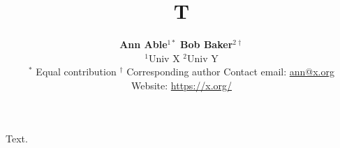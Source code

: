 \documentclass{article}
\begin{document}
\title{T}
\author{\textbf{Ann Able}$^{1\ast}$ \: \textbf{Bob Baker}$^{2\dagger}$

\normalsize $^1$Univ X \quad $^2$Univ Y

$^{\ast}$ Equal contribution \: ${^\dagger}$ Corresponding author \: Contact email: \href{ann@x.org}{ann@x.org}

Website: \href{https://x.org/}{https://x.org/}
}
\maketitle
Text.
\end{document}
